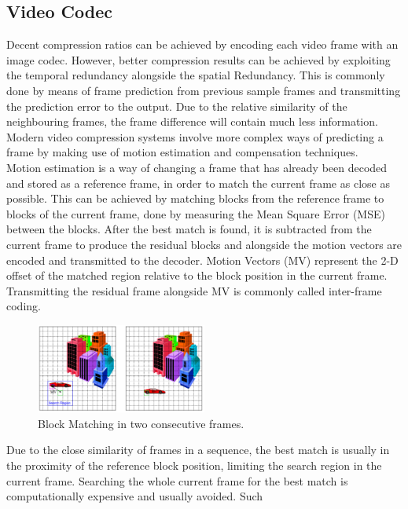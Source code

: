 \documentclass[a4paper,11pt,oneside]{article}
\begin{document}
\subsection{Video Codec}
\indent Decent compression ratios can be achieved by encoding each video frame with an image codec. However, better compression results can be
achieved by exploiting the temporal redundancy alongside the spatial Redundancy. This is commonly done by means of frame prediction from
previous sample frames and transmitting the prediction error to the output. Due to the relative similarity of the neighbouring frames, the
frame difference will contain much less information. Modern video compression systems involve more complex ways of predicting a frame by making
use of motion estimation and compensation techniques. \\
\indent Motion estimation is a way of changing a frame that has already been decoded and stored as a reference frame, in order to match the current frame as close as possible. This can be achieved by matching blocks from the reference frame to blocks of the current frame, done by measuring the Mean Square Error (MSE) between the blocks. After the best match is found, it is subtracted from the current frame to produce the residual blocks and alongside the motion vectors are encoded and transmitted to the decoder. Motion Vectors (MV) represent the 2-D offset of the matched region relative to the block position in the current frame. Transmitting the residual frame alongside MV is commonly called inter-frame coding. \\
\begin{figure}[h]
    \centering  
    \includegraphics[width=0.5\textwidth]{../figures/motion_vectors.pdf}
    \caption{Block Matching in two consecutive frames. \cite[week 14]{wang_video_slides}}
    \label{figure:block_matching}
\end{figure}
Due to the close similarity of frames in a sequence, the best match is usually in the proximity of the reference block position, limiting the
search region in the current frame. Searching the whole current frame for the best match is computationally expensive and usually avoided. Such
\end{document}
